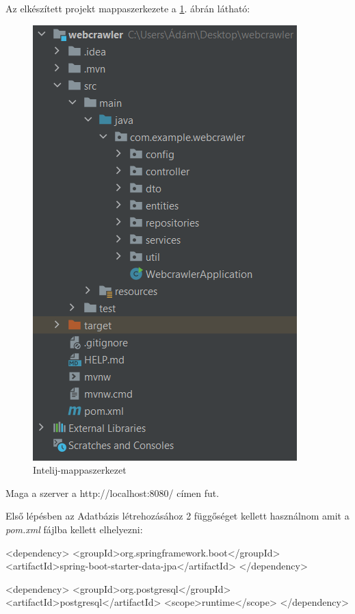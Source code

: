 Az elkészített projekt mappaszerkezete a \ref{fig:Intelij-mappaszerkezet}. ábrán látható:
\begin{figure}[h]
\centering
\includegraphics[scale=0.7]{images/Intelij-mappaszerkezet.png}
\caption{Intelij-mappaszerkezet}
\label{fig:Intelij-mappaszerkezet}
\end{figure}

Maga a szerver a http://localhost:8080/ címen fut.


Első lépésben az Adatbázis létrehozásához 2 függőséget kellett használnom amit a \textit{pom.xml} fájlba kellett elhelyezni:
\begin{java}
<dependency>
	<groupId>org.springframework.boot</groupId>
	<artifactId>spring-boot-starter-data-jpa</artifactId>
</dependency>

<dependency>
	<groupId>org.postgresql</groupId>
	<artifactId>postgresql</artifactId>
	<scope>runtime</scope>
</dependency>
\end{java}

